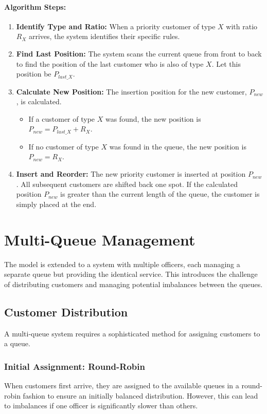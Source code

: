 \documentclass{article}
\begin{document}
\paragraph{Algorithm Steps:}
\begin{enumerate}
    \item \textbf{Identify Type and Ratio:} When a priority customer of type $X$ with ratio $R_X$ arrives, the system identifies their specific rules.
    \item \textbf{Find Last Position:} The system scans the current queue from front to back to find the position of the last customer who is also of type $X$. Let this position be $P_{last\_X}$.
    \item \textbf{Calculate New Position:} The insertion position for the new customer, $P_{new}$, is calculated.
    \begin{itemize}
        \item If a customer of type $X$ was found, the new position is $P_{new} = P_{last\_X} + R_X$.
        \item If no customer of type $X$ was found in the queue, the new position is $P_{new} = R_X$.
    \end{itemize}
    \item \textbf{Insert and Reorder:} The new priority customer is inserted at position $P_{new}$. All subsequent customers are shifted back one spot. If the calculated position $P_{new}$ is greater than the current length of the queue, the customer is simply placed at the end.
\end{enumerate}

\section{Multi-Queue Management}
The model is extended to a system with multiple officers, each managing a separate queue but providing the identical service. This introduces the challenge of distributing customers and managing potential imbalances between the queues.

\subsection{Customer Distribution}
A multi-queue system requires a sophisticated method for assigning customers to a queue.
\subsubsection{Initial Assignment: Round-Robin}
When customers first arrive, they are assigned to the available queues in a round-robin fashion to ensure an initially balanced distribution. However, this can lead to imbalances if one officer is significantly slower than others.
\end{document}
